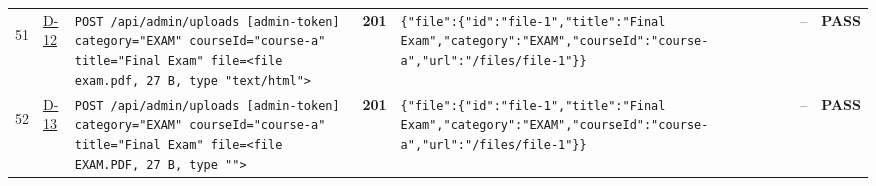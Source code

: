 \documentclass[10pt,a4paper]{article}
\begin{document}
\begin{landscape}
\begin{longtable}{@{}P{0.6cm}P{0.9cm}P{8.5cm}P{1.0cm}P{6.2cm}P{4.2cm}P{1.1cm}@{}}
\hypertarget{call51}{51} & \hyperlink{test-D-12}{D-12} & \texttt{POST /\allowbreak{}api/\allowbreak{}admin/\allowbreak{}uploads [admin-\allowbreak{}token] category=\allowbreak{}"\allowbreak{}EXAM"\allowbreak{} courseId=\allowbreak{}"\allowbreak{}course-\allowbreak{}a"\allowbreak{} title=\allowbreak{}"\allowbreak{}Final Exam"\allowbreak{} file=\allowbreak{}<file exam.\allowbreak{}pdf,\allowbreak{} 27 B,\allowbreak{} type "\allowbreak{}text/\allowbreak{}html"\allowbreak{}>} & \textcolor{passgreen}{\textbf{201}} & \texttt{\{"\allowbreak{}file"\allowbreak{}:\allowbreak{}\{"\allowbreak{}id"\allowbreak{}:\allowbreak{}"\allowbreak{}file-\allowbreak{}1"\allowbreak{},\allowbreak{}"\allowbreak{}title"\allowbreak{}:\allowbreak{}"\allowbreak{}Final Exam"\allowbreak{},\allowbreak{}"\allowbreak{}category"\allowbreak{}:\allowbreak{}"\allowbreak{}EXAM"\allowbreak{},\allowbreak{}"\allowbreak{}courseId"\allowbreak{}:\allowbreak{}"\allowbreak{}course-\allowbreak{}a"\allowbreak{},\allowbreak{}"\allowbreak{}url"\allowbreak{}:\allowbreak{}"\allowbreak{}/\allowbreak{}files/\allowbreak{}file-\allowbreak{}1"\allowbreak{}\}\}} & -- & \textcolor{passgreen}{\textbf{PASS}} \\
\hypertarget{call52}{52} & \hyperlink{test-D-13}{D-13} & \texttt{POST /\allowbreak{}api/\allowbreak{}admin/\allowbreak{}uploads [admin-\allowbreak{}token] category=\allowbreak{}"\allowbreak{}EXAM"\allowbreak{} courseId=\allowbreak{}"\allowbreak{}course-\allowbreak{}a"\allowbreak{} title=\allowbreak{}"\allowbreak{}Final Exam"\allowbreak{} file=\allowbreak{}<file EXAM.\allowbreak{}PDF,\allowbreak{} 27 B,\allowbreak{} type "\allowbreak{}"\allowbreak{}>} & \textcolor{passgreen}{\textbf{201}} & \texttt{\{"\allowbreak{}file"\allowbreak{}:\allowbreak{}\{"\allowbreak{}id"\allowbreak{}:\allowbreak{}"\allowbreak{}file-\allowbreak{}1"\allowbreak{},\allowbreak{}"\allowbreak{}title"\allowbreak{}:\allowbreak{}"\allowbreak{}Final Exam"\allowbreak{},\allowbreak{}"\allowbreak{}category"\allowbreak{}:\allowbreak{}"\allowbreak{}EXAM"\allowbreak{},\allowbreak{}"\allowbreak{}courseId"\allowbreak{}:\allowbreak{}"\allowbreak{}course-\allowbreak{}a"\allowbreak{},\allowbreak{}"\allowbreak{}url"\allowbreak{}:\allowbreak{}"\allowbreak{}/\allowbreak{}files/\allowbreak{}file-\allowbreak{}1"\allowbreak{}\}\}} & -- & \textcolor{passgreen}{\textbf{PASS}} \\

\end{longtable}
\end{landscape}
\end{document}
